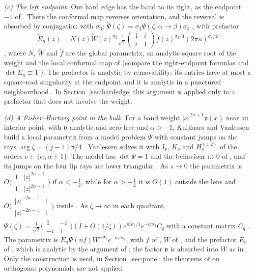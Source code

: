 \emph{(c) The left endpoint.} Our hard edge has the band to its right, as the endpoint $-1$ of \cite{KMVV}. There the
conformal map reverses orientation, and the reversal is absorbed by conjugation with $\sigma_3$:
$\tilde\Psi(\zeta)=\sigma_3\Psi(\zeta;\alpha\to\beta)\sigma_3$ \cite[(6.51)]{KMVV}, with prefactor
\[
  \tilde E_n(z)=N(z)\tilde W(z)^{\sigma_3}\tfrac1{\sqrt2}\begin{pmatrix}1&i\\i&1\end{pmatrix}
  \tilde f(z)^{\sigma_3/4}(2\pi n)^{\sigma_3/2}
\]
\cite[(6.53)]{KMVV}, where $N$, $\tilde W$ and $\tilde f$ are the global parametrix, an analytic square root of the
weight and the local conformal map of \cite[(6.42)--(6.50)]{KMVV} (compare the right-endpoint formulas
\cite[(6.27), (6.31)]{KMVV} and $\det E_n\equiv1$ \cite[(6.33)]{KMVV}). The prefactor is analytic by removability: its
entries have at most a square-root singularity at the endpoint and it is analytic in a punctured neighbourhood
\cite[proof of Proposition~6.5]{KMVV}. In Section~\ref{sec:hardedge} this argument is applied only to a prefactor that
does not involve the weight.

\emph{(d) A Fisher--Hartwig point in the bulk.} For a band weight $|x|^{2\alpha+1}\mathfrak v(x)$ near an interior point, with $\mathfrak v$
analytic and zero-free and $\alpha>-1$, Kuijlaars and Vanlessen \cite[\S5]{KV} build a local parametrix from a
model problem $\Psi$ with constant jumps on the rays $\arg\zeta=(j-1)\pi/4$ \cite[(5.17)--(5.20)]{KV}. Vanlessen
\cite[(4.26)--(4.33)]{Van} solves it with $I_\nu$, $K_\nu$ and $H^{(1,2)}_\nu$ of the orders $\nu\in\{\alpha,\alpha+1\}$. The
model has $\det\Psi=1$ \cite[(4.53)]{Van} and the behaviour at $0$ of \cite[(5.21)--(5.22)]{KV}, and its jumps on the four
lip rays are lower triangular \cite[(5.18), (5.20)]{KV}. As $z\to0$ the parametrix is
$O\bigl(\begin{smallmatrix}1&|z|^{2\alpha+1}\\1&|z|^{2\alpha+1}\end{smallmatrix}\bigr)$ if $\alpha<-\frac12$, while
for $\alpha>-\frac12$ it is $O(1)$ outside the lens and
$O\bigl(\begin{smallmatrix}|z|^{-2\alpha-1}&1\\|z|^{-2\alpha-1}&1\end{smallmatrix}\bigr)$ inside \cite[(5.4)--(5.5)]{KV}. As $\zeta\to\infty$ in each
quadrant, $\Psi(\zeta)=\frac1{\sqrt2}\bigl(\begin{smallmatrix}1&-i\\-i&1\end{smallmatrix}\bigr)(I+O(1/\zeta))e^{\pi
i\sigma_3/4}e^{-i\zeta\sigma_3}C_q$ with a constant matrix $C_q$ \cite[(4.43)--(4.46)]{Van}. The parametrix is
$E_n\Psi(nf)W^{-\sigma_3}e^{-n\varphi\sigma_3}$, with $f$ of \cite[(5.6)]{KV}, $W$ of \cite[(5.9)]{KV}, and the
prefactor $E_n$ of \cite[(5.26)--(5.30)]{KV}, which is analytic by the argument of \cite[p.~19]{KV}; the factor $\mathfrak v$ is
absorbed into $W$ as in \cite[\S4.1]{Van}. Only the construction is used, in Section~\ref{sec:pone}; the theorems of
\cite{KV,Van} on orthogonal polynomials are not applied.


